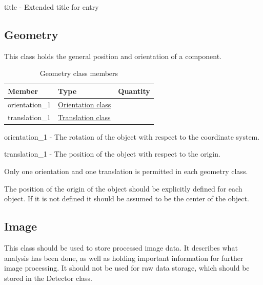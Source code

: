 \documentclass[usletter,11pt]{article}
\newcommand{\member}[2]
{ \noindent
{ \color{softBlue}  #1 - } #2
\vspace{0.2cm}
}
\begin{document}
\member{title}{Extended title for entry}

\subsection{Geometry}
\label{table:geometry}

This class holds the general position and orientation of a component.

\begin{table}[h!]\sffamily \footnotesize
\caption{Geometry class members}

\begin{tabular}{p{4.5cm} p{4.5cm}  p{2.5cm} }
\toprule
\bfseries Member     & \bfseries Type & \bfseries Quantity \\
\midrule

orientation\_1 & \hyperref[table:orientation]{Orientation class} & \\
translation\_1 & \hyperref[table:translation]{Translation class} &  \\

\bottomrule
\end{tabular}
\end{table}

\member{orientation\_1}{The rotation of the object with respect to the
  coordinate system.}

\member{translation\_1}{The position of the object with respect to the
origin.}

Only one orientation and one translation is permitted in each geometry
class.

The position of the origin of the object should be explicitly defined for each
object. If it is not defined it should be assumed to be the center of
the object.

\subsection{Image}
\label{table:image}

This class should be used to store processed image data. It describes
what analysis has been done, as well as holding important information
for further image processing. It should not be used for raw data
storage, which should be stored in the Detector class.
\end{document}
